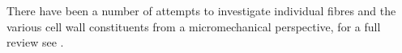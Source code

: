 There have been a number of attempts to investigate individual fibres and the  various cell wall constituents from a micromechanical perspective, for a full review see \cite{Eder_2012}.